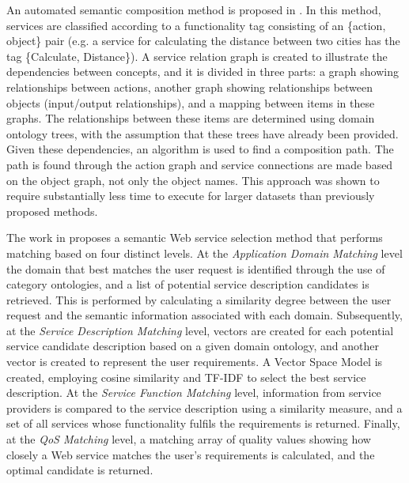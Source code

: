 An automated semantic composition method is proposed in \cite{shin2007automated}. In this method, services are classified according to a functionality tag consisting of an \{action, object\} pair (e.g. a service for calculating the distance between two cities has the tag \{Calculate, Distance\}). A service relation graph is created to illustrate the dependencies between concepts, and it is divided in three parts: a graph showing relationships between actions, another graph showing relationships between objects (input/output relationships), and a mapping between items in these graphs. The relationships between these items are determined using domain ontology trees, with the assumption that these trees have already been provided. Given these dependencies, an algorithm is used to find a composition path. The path is found through the action graph and service connections are made based on the object graph, not only the object names. This approach was shown to require substantially less time to execute for larger datasets than previously proposed methods.

The work in \cite{guo2010four} proposes a semantic Web service selection method that performs matching based on four distinct levels. At the \textit{Application Domain Matching} level the domain that best matches the user request is identified through the use of category ontologies, and a list of potential service description candidates is retrieved. This is performed by calculating a similarity degree between the user request and the semantic information associated with each domain. Subsequently, at the \textit{Service Description Matching} level, vectors are created for each potential service candidate description based on a given domain ontology, and another vector is created to represent the user requirements. A Vector Space Model is created, employing cosine similarity and TF-IDF to select the best service description. At the \textit{Service Function Matching} level, information from service providers is compared to the service description using a similarity measure, and a set of all services whose functionality fulfils the requirements is returned. Finally, at the \textit{QoS Matching} level, a matching array of quality values showing how closely a Web service matches the user's requirements is calculated, and the optimal candidate is returned.

